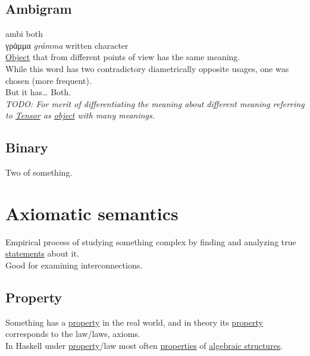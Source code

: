 \documentclass[a4paper,14pt,oneside]{book}
\begin{document}
\subsection{\label{org8da28cf}Ambigram}
\label{sec:org1bd6915}
ambi both\\
γράμμα \emph{grámma} written character\\

\hyperref[orgef6fa9d]{Object} that from different points of view has the same meaning.\\

While this word has two contradictory diametrically opposite usages, one was chosen (more frequent).\\

But it has\ldots{} Both.\\

\emph{TODO: For merit of differentiating the meaning about different meaning referring to \hyperref[org5ebe6c7]{Tensor} as \hyperref[orgef6fa9d]{object} with many meanings.}\\

\subsection{\label{org969957a}Binary}
\label{sec:orgf6b8b02}
Two of something.\\

\section{\label{org1b58750}Axiomatic semantics}
\label{sec:orgc169e3b}
Empirical process of studying something complex by finding and analyzing true \hyperref[org317a579]{statements} about it.\\

Good for examining interconnections.\\

\subsection{\label{orgc713167}Property}
\label{sec:org3b13bac}
Something has a \hyperref[orgc713167]{property} in the real world, and in theory its \hyperref[orgc713167]{property} corresponds to the law/laws, axioms.\\

In Haskell under \hyperref[orgc713167]{property}/law most often \hyperref[orgbcfea7d]{properties} of \hyperref[org8cd650d]{algebraic structures}.\\
\end{document}
